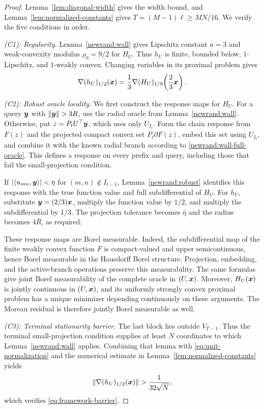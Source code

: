 \begin{proof}
Lemma~\ref{lem:diagonal-width} gives the width bound, and
Lemma~\ref{lem:normalized-constants} gives
$T=(M-1)\ell\ge MN/16$. We verify the five conditions in order.

\emph{(C1): Regularity.}
Lemma~\ref{newrand:wall} gives Lipschitz constant $a=3$ and
weak-convexity modulus $\rho_0=9/2$ for $H_U$.
Thus $h_U$ is finite, bounded below, $1$-Lipschitz,
and $1$-weakly convex. Changing variables in its proximal problem gives
\begin{equation}
 \nabla(h_U)_{1/2}(\bm{x})
 =\frac13\nabla(H_U)_{1/9}\!\left(\frac23\bm{x}\right).
 \label{eq:unit-normalization}
\end{equation}

\emph{(C2): Robust oracle locality.}
We first construct the response maps for $H_U$.
For a query $\bm{y}$ with $\|\y\|>3R$, use the radial oracle from
Lemma~\ref{newrand:wall}. Otherwise, put $z=P_tU^\top\bm{y}$,
which uses only $U_{I_t}$. Form the chain response from $F(z)$
and the projected compact convex set $P_t\partial F(z)$,
embed this set using $U_{I_t}$, and combine it with the known
radial branch according to \eqref{newrand:wall-full-oracle}.
This defines a response on every prefix and query, including
those that fail the small-projection condition.

If $|\langle u_{mn},\bm{y}\rangle|<\eta$ for $(m,n)\notin I_{t-1}$,
Lemma~\ref{newrand:robust} identifies this response with the
true function value and full subdifferential of $H_U$.
For $h_U$, substitute $\bm{y}=(2/3)\bm{x}$, multiply the function value
by $1/2$, and multiply the subdifferential by $1/3$.
The projection tolerance becomes $\bar\eta$ and the radius
becomes $4\bar R$, as required.

These response maps are Borel measurable. Indeed, the
subdifferential map of the finite weakly convex function $F$
is compact-valued and upper semicontinuous, hence Borel
measurable in the Hausdorff Borel structure. Projection,
embedding, and the active-branch operations preserve this
measurability. The same formulas give joint Borel measurability
of the complete oracle in $(U,\bm{x})$.
Moreover, $H_U(\bm{x})$ is jointly continuous in $(U,\bm{x})$, and
its uniformly strongly convex proximal problem has a unique
minimizer depending continuously on these arguments.
The Moreau residual is therefore jointly Borel measurable as well.

\emph{(C3): Terminal stationarity barrier.}
The last block lies outside $V_{T-1}$. Thus the terminal
small-projection condition supplies at least $N$ coordinates
to which Lemma~\ref{newrand:wall} applies. Combining that lemma
with \eqref{eq:unit-normalization} and the numerical estimate
in Lemma~\ref{lem:normalized-constants} yields
\[
 \|\nabla(h_U)_{1/2}(\bm{x})\|
 >\frac1{32\sqrt N},
\]
which verifies \eqref{eq:framework-barrier}.


\end{proof}
